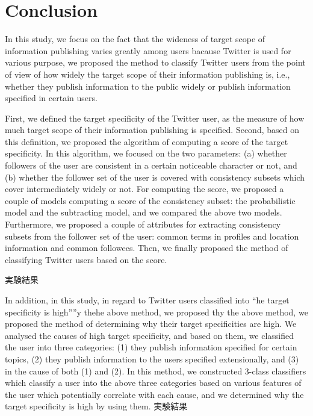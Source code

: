 \section{Conclusion}
\label{sec:Conclusion}

In this study, we focus on the fact that the wideness of target scope of
information publishing varies greatly among users bacause Twitter is
used for various purpose, we proposed the method to classify Twitter
users from the point of view of how widely the target scope of their
information publishing is, i.e., whether they publish information to the
public widely or publish information specified in certain users.

First, we defined the target specificity of the Twitter user, as the
measure of how much target scope of their information publishing is
specified.  Second, based on this definition, we proposed the algorithm
of computing a score of the target specificity.  In this algorithm, we
focused on the two parameters: (a) whether followers of the user are
consistent in a certain noticeable character or not, and (b) whether the
follower set of the user is covered with consistency subsets which cover
intermediately widely or not.  For computing the score, we proposed a
couple of models computing a score of the consistency subset: the
probabilistic model and the subtracting model, and we compared the above
two models.  Furthermore, we proposed a couple of attributes for
extracting consistency subsets from the follower set of the user: common
terms in profiles and location information and common followees.  Then,
we finally proposed the method of classifying Twitter users based on the
score.

実験結果

In addition, in this study, in regard to Twitter users classified into
``he target specificity is high”''y thehe above method, we proposed thy
the above method, we proposed the method of determining why their target
specificities are high.  We analysed the causes of high target
specificity, and based on them, we classified the user into three
categories: (1) they publish information specified for certain topics,
(2) they publish information to the users specified extensionally, and
(3) in the cause of both (1) and (2).  In this method, we constructed
3-class classifiers which classify a user into the above three
categories based on various features of the user which potentially
correlate with each cause, and we determined why the target specificity
is high by using them.
実験結果


